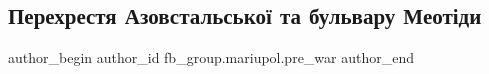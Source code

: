  
 
 
 
 

\subsection{Перехрестя Азовстальської та бульвару Меотіди}
\label{sec:29_01_2023.fb.fb_group.mariupol.pre_war.2.perekhrestya_azovsta}

\ifcmt
 author_begin
   author_id fb_group.mariupol.pre_war
 author_end
\fi

